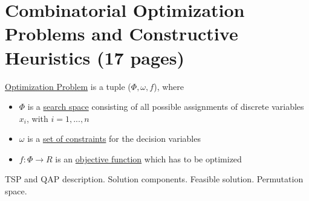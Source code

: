 \section{Combinatorial Optimization Problems and Constructive
Heuristics (17 pages)}

\begin{definition}
	\underline{Optimization Problem} is a tuple ($\Phi,\omega, f$), where
	\begin{itemize}
		\item{$\Phi$ is a \underline{search space} consisting of all possible assignments of discrete variables $x_i$, with $i=1,...,n$ }
		\item{$\omega$ is a \underline{set of constraints} for the decision variables}
		\item{$f:\Phi \to R$ is an \underline{objective function} which has to be optimized}
	\end{itemize}
\end{definition}

TSP and QAP description.
Solution components.
Feasible solution.
Permutation space.